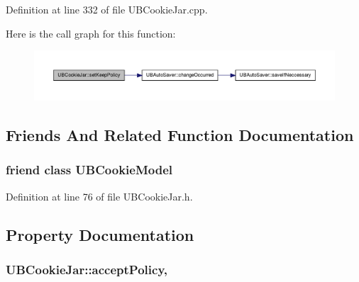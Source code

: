 Definition at line 332 of file U\-B\-Cookie\-Jar.\-cpp.



Here is the call graph for this function\-:
\nopagebreak
\begin{figure}[H]
\begin{center}
\leavevmode
\includegraphics[width=350pt]{dd/d20/class_u_b_cookie_jar_a066435125753c0764d8370d6903d8ce6_cgraph}
\end{center}
\end{figure}




\subsection{Friends And Related Function Documentation}
\hypertarget{class_u_b_cookie_jar_a7f691c55380714fa80806552ef19dd61}{
\subsubsection[{U\-B\-Cookie\-Model}]{\setlength{\rightskip}{0pt plus 5cm}friend class U\-B\-Cookie\-Model\hspace{0.3cm}{\ttfamily [friend]}}}\label{dd/d20/class_u_b_cookie_jar_a7f691c55380714fa80806552ef19dd61}


Definition at line 76 of file U\-B\-Cookie\-Jar.\-h.



\subsection{Property Documentation}
\hypertarget{class_u_b_cookie_jar_ab3f40d275cab52e1927ed806a991584c}{
\subsubsection[{accept\-Policy}]{ U\-B\-Cookie\-Jar\-::accept\-Policy\hspace{0.3cm}{\ttfamily [read]}, {\ttfamily [write]}}}\label{dd/d20/class_u_b_cookie_jar_ab3f40d275cab52e1927ed806a991584c}


